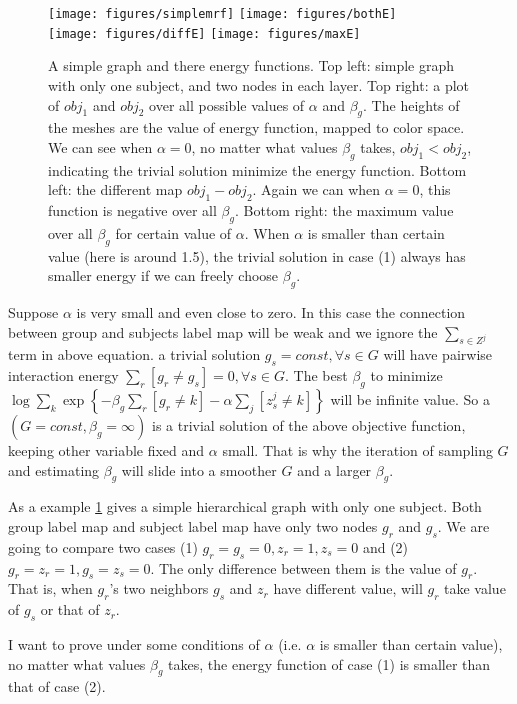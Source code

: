 \documentclass{article}
\begin{document}
\begin{figure}[htb]
\centering
\texttt{[image: figures/simplemrf]}
\texttt{[image: figures/bothE]}\\
\texttt{[image: figures/diffE]}
\texttt{[image: figures/maxE]}
\caption{A simple graph and there energy functions. Top left: simple graph with only one subject, and two nodes in each layer. Top right: a plot of $obj_1$ and $obj_2$ over all possible values of $\alpha$ and $\beta_g$. The heights of the meshes are the value of energy function, mapped to color space. We can see when $\alpha = 0$, no matter what values $\beta_g$ takes, $obj_1 < obj_2$, indicating the trivial solution minimize the energy function. Bottom left: the different map $obj_1 - obj_2$. Again we can when $\alpha = 0$, this function is negative over all $\beta_g$. Bottom right: the maximum value over all $\beta_g$ for certain value of $\alpha$. When $\alpha$ is smaller than certain value (here is around 1.5), the trivial solution in case (1) always has smaller energy if we can freely choose $\beta_g$.}
\label{fig:simplemrf}
\end{figure}

Suppose $\alpha$ is very small and even close to zero. In this case the connection between group and subjects label map will be weak and we ignore the $\sum_{s\in Z^j}$ term in above equation. a trivial solution $g_s = const, \forall s \in G$ will have pairwise interaction energy $\sum_r [g_r\neq g_s] = 0, \forall s\in G$. The best $\beta_g$ to minimize $\log \sum_k \exp \left\{ -\beta_g \sum_r [g_r\neq k] - \alpha\sum_j [z_s^j \neq k] \right\}$ will be infinite value. So a $(G=const, \beta_g = \infty)$ is a trivial solution of the above objective function, keeping other variable fixed and $\alpha$ small. That is why the iteration of sampling $G$ and estimating $\beta_g$ will slide into a smoother $G$ and a larger $\beta_g$.

As a example \ref{fig:simplemrf} gives a simple hierarchical graph with only one subject. Both group label map and subject label map have only two nodes $g_r$ and $g_s$. We are going to compare two cases (1) $g_r = g_s = 0, z_r = 1, z_s = 0$ and (2) $g_r = z_r = 1, g_s = z_s = 0$. The only difference between them is the value of $g_r$. That is, when $g_r$'s two neighbors $g_s$ and $z_r$ have different value, will $g_r$ take value of $g_s$ or that of $z_r$.

I want to prove under some conditions of $\alpha$ (i.e. $\alpha$ is smaller than certain value), no matter what values $\beta_g$ takes, the energy function of case (1) is smaller than that of case (2).
\end{document}
